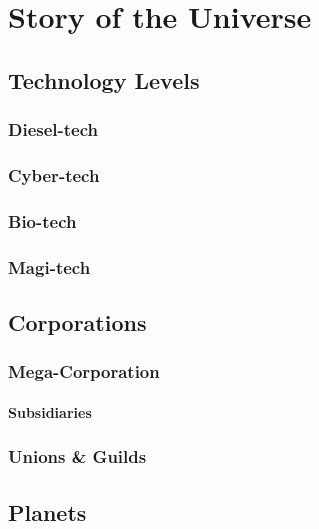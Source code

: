 \part{Story of the Universe}\label{part:story}

\chapter{Technology Levels}\label{ch:tech_lore}

\section{Diesel-tech}\label{sec:dieseltech_lore}

\section{Cyber-tech}\label{sec:cybertech_lore}

\section{Bio-tech}\label{sec:biotech_lore}

\section{Magi-tech}\label{sec:magitech_lore}

\chapter{Corporations}\label{ch:corp_lore}

\section{Mega-Corporation}\label{sec:megacorp_lore}

\subsection{Subsidiaries}\label{subsec:subcorp_lore}

\section{Unions \& Guilds}\label{sec:unions_guilds}

\chapter{Planets}\label{ch:planets}

